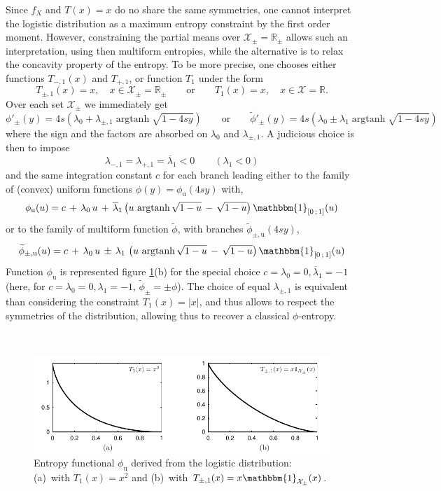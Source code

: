 \documentclass[english,sort&compress]{elsarticle}
\theoremstyle{definition}
\theoremstyle{plain}
\theoremstyle{plain}
\def\Rset{\mathbb{R}}
\def\X{\mathcal{X}}
\def\un{\mathbbm{1}}
\def\argtanh{\operatorname{argtanh}}
\begin{document}
Since $f_X$ and $T(x) = x$ do no share the same symmetries, one cannot interpret
the logistic  distribution as  a maximum entropy  constraint by the  first order
moment. However,  constraining the partial  means over $\X_\pm  = \Rset_\pm$
allows  such  an  interpretation,  using  then multiform  entropies,  while  the
alternative  is to  relax the  concavity  property of  the entropy.  To be  more
precise, one  chooses either functions $T_{-,1}(x)$ and  $T_{+,1}$, or function
$T_1$ under the form
%
\[
T_{\pm,1}(x) = x, \quad x \in  \X_\pm = \Rset_\pm \qquad \mbox{or} \qquad T_1(x)
= x,\quad x \in \X = \Rset.
\]
%
Over each set $\X_\pm$ we immediately get 
%
\[
\phi'_\pm(y)  = 4  s \left(  \lambda_0 +  \lambda_{\pm,1} \argtanh\sqrt{1-4sy}
\right)  \qquad  \mbox{or}  \qquad   \widetilde{\phi}'_\pm(y)  =  4  s  \left(
  \lambda_0 \pm \lambda_1 \argtanh\sqrt{1-4sy} \right)
\]
%
where   the   sign  and   the   factors   are   absorbed  on   $\lambda_0$   and
$\lambda_{\pm,1}$. A judicious choice is then to impose
%
\[
\lambda_{-,1} = \lambda_{+,1} = \overline{\lambda}_1 < 0 \qquad (\lambda_1 < 0)
\]
%
and the  same integration constant  $c$ for each  branch leading either  to the
family of (convex) uniform functions $\phi(y) = \phi_{\mathrm{u}}(4 s y)$ with,
%
\[
\phi_{\mathrm{u}}(u) =  c \, +  \, \lambda_0 \,  u \, +  \, \overline{\lambda}_1
\left( u \, \argtanh\sqrt{1-u} \, -  \, \sqrt{1-u} \right) \un_{\left[ 0 \, ; \,
    1 \right]}(u)
\]
%
or  to  the  family  of  multiform function  $\widetilde{\phi}$,  with  branches
$\widetilde{\phi}_{\pm,\mathrm{u}}(4 s y)$,
%
\[
\widetilde{\phi}_{\pm,\mathrm{u}}(u)  = c  \,  + \,  \lambda_0  \, u  \, \pm  \,
\lambda_1  \,  \left(  u  \,  \argtanh\sqrt{1-u}  \,  -  \,  \sqrt{1-u}  \right)
\un_{\left[ 0 \, ; \, 1 \right]}(u)
\]
%
Function $\phi_{\mathrm{u}}$ is represented figure \ref{fig:Entropy-logistic}(b)
for the special choice $c = \lambda_0 = 0, \overline{\lambda}_1 = -1$ (here, for
$c =  \lambda_0 = 0, \lambda_1  = -1$, $\widetilde{\phi}_\pm =  \pm \phi$).  The
choice of equal $\lambda_{\pm,1}$  is equivalent than considering the constraint
$T_1(x) = |x|$,  and thus allows to respect the  symmetries of the distribution,
allowing thus to recover a classical $\phi$-entropy.

\

\begin{figure}[htbp]
\centerline{\includegraphics[width=.9\textwidth]{PDF/MaxEnt_LogisticLaw}}
\caption{Entropy  functional  $\phi_{\mathrm{u}}$   derived  from  the  logistic
  distribution:  (a)~with  $T_1(x)  =   x^2$  and  (b)~with  $T_{\pm,1}(x)  =  x
  \un_{\X_\pm}(x)$.}
\label{fig:Entropy-logistic}
\end{figure}
\end{document}
